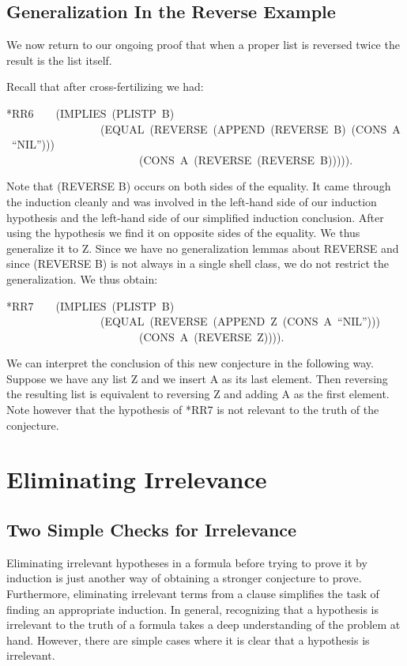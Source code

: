 \documentclass[11pt]{book}
\newenvironment{pubasis}{\begin{flushleft}\ttfamily\small}{\normalsize\rmfamily\end{flushleft}}
\newcommand{\pubdefaulttextsize}{\large}
\begin{document}
\section{Generalization In the Reverse Example}
\pubdefaulttextsize
We now return to our ongoing proof that when a
proper list is reversed twice the result is the list itself.

Recall that after cross-fertilizing we had:
\begin{pubasis}
*RR6~~~~(IMPLIES~(PLISTP~B)\\
~~~~~~~~~~~~~~~~~(EQUAL~(REVERSE~(APPEND~(REVERSE~B)~(CONS~A~``NIL'')))\\
~~~~~~~~~~~~~~~~~~~~~~~~(CONS~A~(REVERSE~(REVERSE~B))))).\\
\end{pubasis}
Note that (REVERSE B) occurs on both sides of the equality.
It came through the induction cleanly and was involved
in the left-hand side of our induction hypothesis and the left-hand side        
of our simplified induction conclusion.  After using the hypothesis we
find it on opposite sides of the equality.  We thus generalize it
to Z.  
Since we have no generalization lemmas about REVERSE and
since (REVERSE B) is not always in a single shell class, we do not
restrict the generalization.  We thus obtain:
\begin{pubasis}
*RR7~~~~(IMPLIES~(PLISTP~B)\\
~~~~~~~~~~~~~~~~~(EQUAL~(REVERSE~(APPEND~Z~(CONS~A~``NIL'')))\\
~~~~~~~~~~~~~~~~~~~~~~~~(CONS~A~(REVERSE~Z)))).\\
\end{pubasis}
We can interpret the conclusion of this new conjecture in
the following way.
Suppose we have any list Z and we insert A as its last element.
Then reversing the resulting list is equivalent to reversing Z
and adding A as the first element.  Note however that the hypothesis
of *RR7 is not relevant to the truth of the conjecture.
\chapter{Eliminating Irrelevance}
\label{SECIRRELEVANCE}
\pubdefaulttextsize
\section{Two Simple Checks for Irrelevance}
\pubdefaulttextsize
Eliminating irrelevant hypotheses in a formula before trying to
prove it by induction is just another way
of obtaining a stronger  conjecture to prove.
Furthermore, eliminating irrelevant
terms from a clause simplifies the task of
finding an appropriate induction.
In general, recognizing that a hypothesis is irrelevant
to the truth of a formula takes a deep understanding of the problem
at hand.  However, there are simple cases where it is clear that
a hypothesis is irrelevant.
\end{document}
